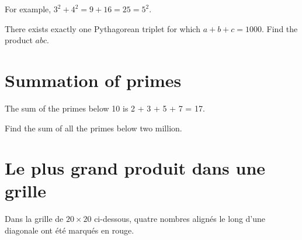 For example, $3^2 + 4^2 = 9 + 16 = 25 = 5^2$.

There exists exactly one Pythagorean triplet for which $a + b + c = 1000$. Find the product $abc$.


\section{Summation of primes} \label{pb.010}

The sum of the primes below 10 is 2 + 3 + 5 + 7 = 17.

Find the sum of all the primes below two million.


\newpage


\section{Le plus grand produit dans une grille} \label{pb.011}
Dans la grille de $20\times20$ ci-dessous, quatre nombres alignés le long d'une diagonale ont été marqués en rouge.


